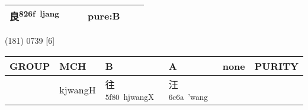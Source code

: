 \documentclass[14pt,a4paper]{scrartcl}
\begin{document}
\begin{longtable}[c]{@{}llllll@{}}
\begin{minipage}[t]{0.14\columnwidth}\raggedright\strut
良\textsuperscript{826f~ljang}
\strut\end{minipage} &
\begin{minipage}[t]{0.14\columnwidth}\raggedright\strut
\strut\end{minipage} &
\begin{minipage}[t]{0.14\columnwidth}\raggedright\strut
\strut\end{minipage} &
\begin{minipage}[t]{0.14\columnwidth}\raggedright\strut
pure:B
\strut\end{minipage}\tabularnewline
\bottomrule
\end{longtable}

(181) 0739 {[}6{]}

\begin{longtable}[c]{@{}llllll@{}}
\toprule
\begin{minipage}[b]{0.14\columnwidth}\raggedright\strut
GROUP
\strut\end{minipage} &
\begin{minipage}[b]{0.14\columnwidth}\raggedright\strut
MCH
\strut\end{minipage} &
\begin{minipage}[b]{0.14\columnwidth}\raggedright\strut
B
\strut\end{minipage} &
\begin{minipage}[b]{0.14\columnwidth}\raggedright\strut
A
\strut\end{minipage} &
\begin{minipage}[b]{0.14\columnwidth}\raggedright\strut
none
\strut\end{minipage} &
\begin{minipage}[b]{0.14\columnwidth}\raggedright\strut
PURITY
\strut\end{minipage}\tabularnewline
\midrule
\endhead
\begin{minipage}[t]{0.14\columnwidth}\raggedright\strut
𡉚
\strut\end{minipage} &
\begin{minipage}[t]{0.14\columnwidth}\raggedright\strut
kjwangH
\strut\end{minipage} &
\begin{minipage}[t]{0.14\columnwidth}\raggedright\strut
往\textsuperscript{5f80~hjwangX}
\strut\end{minipage} &
\begin{minipage}[t]{0.14\columnwidth}\raggedright\strut
汪\textsuperscript{6c6a~'wang}
\strut\end{minipage} &

\end{longtable}
\end{document}
